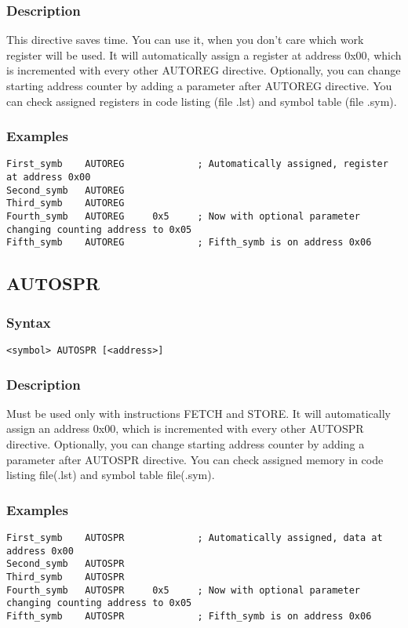         \subsubsection{Description}
            This directive saves time. You can use it, when you don't care which work register will be used. It will automatically assign a register at address 0x00, which is incremented with every other AUTOREG directive. Optionally, you can change starting address counter by adding a parameter after AUTOREG directive. You can check assigned registers in code listing (file .lst) and symbol table (file .sym).

        \subsubsection{Examples}
            \verb'First_symb    AUTOREG             ; Automatically assigned, register at address 0x00'\\
            \verb'Second_symb   AUTOREG'\\
            \verb'Third_symb    AUTOREG'\\
            \verb'Fourth_symb   AUTOREG     0x5     ; Now with optional parameter changing counting address to 0x05'\\
            \verb'Fifth_symb    AUTOREG             ; Fifth_symb is on address 0x06'

    \subsection{AUTOSPR}
        \subsubsection{Syntax}
            \verb'<symbol> AUTOSPR [<address>]'

    \subsubsection{Description}
        Must be used only with instructions FETCH and STORE. It will automatically assign an address 0x00, which is incremented with every other AUTOSPR directive. Optionally, you can change starting address counter by adding a parameter after AUTOSPR directive. You can check assigned memory in code listing file(.lst) and symbol table file(.sym).

    \subsubsection{Examples}
        \verb'First_symb    AUTOSPR             ; Automatically assigned, data at address 0x00'\\
        \verb'Second_symb   AUTOSPR'\\
        \verb'Third_symb    AUTOSPR'\\
        \verb'Fourth_symb   AUTOSPR     0x5     ; Now with optional parameter changing counting address to 0x05'\\
        \verb'Fifth_symb    AUTOSPR             ; Fifth_symb is on address 0x06'

